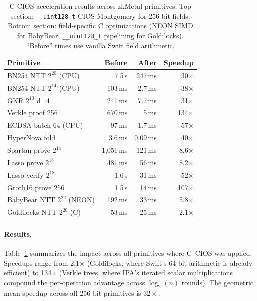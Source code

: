 \begin{table}[t]
\centering
\small
\begin{tabular}{lrrr}
\toprule
\textbf{Primitive} & \textbf{Before} & \textbf{After} & \textbf{Speedup} \\
\midrule
BN254 NTT $2^{20}$  (CPU)    & 7.5\,s    & 247\,ms   & 30$\times$ \\
BN254 NTT $2^{14}$  (CPU)    & 103\,ms   & 2.7\,ms   & 38$\times$ \\
GKR $2^{10}$ d=4             & 241\,ms   & 7.7\,ms   & 31$\times$ \\
Verkle proof 256             & 670\,ms   & 5\,ms     & 134$\times$ \\
ECDSA batch 64 (CPU)         & 97\,ms    & 1.7\,ms   & 57$\times$ \\
HyperNova fold               & 3.6\,ms   & 0.09\,ms  & 40$\times$ \\
Spartan prove $2^{14}$       & 1{,}051\,ms & 121\,ms & 8.6$\times$ \\
Lasso prove $2^{18}$         & 481\,ms   & 56\,ms    & 8.2$\times$ \\
Lasso verify $2^{18}$        & 1.6\,s    & 31\,ms    & 52$\times$ \\
Groth16 prove 256            & 1.5\,s    & 14\,ms    & 107$\times$ \\
\midrule
BabyBear NTT $2^{22}$ (NEON) & 192\,ms   & 33\,ms    & 5.8$\times$ \\
Goldilocks NTT $2^{20}$ (C)  & 53\,ms    & 25\,ms    & 2.1$\times$ \\
\bottomrule
\end{tabular}
\caption{C CIOS acceleration results across zkMetal primitives. Top section:
  \texttt{\_\_uint128\_t} CIOS Montgomery for 256-bit fields. Bottom section:
  field-specific C optimizations (NEON SIMD for BabyBear, \texttt{\_\_uint128\_t}
  pipelining for Goldilocks). ``Before'' times use vanilla Swift field
  arithmetic.}
\label{tab:ccios}
\end{table}

\paragraph{Results.}
Table~\ref{tab:ccios} summarizes the impact across all primitives where C~CIOS
was applied. Speedups range from 2.1$\times$ (Goldilocks, where Swift's 64-bit
arithmetic is already efficient) to 134$\times$ (Verkle trees, where IPA's
iterated scalar multiplications compound the per-operation advantage across
$\log_2(n)$ rounds). The geometric mean speedup across all 256-bit primitives
is $32\times$.


